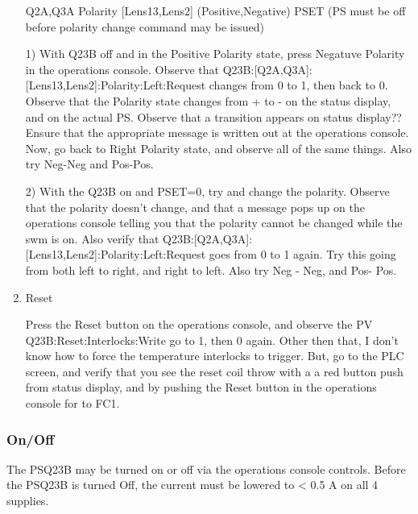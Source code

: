 \documentclass[11pt]{book}		%
\begin{document}
\begin{enumerate}
 \item [Q2A,Q3A] Polarity [Lens13,Lens2] (Positive,Negative) PSET (PS must be off before polarity change command may be issued)

\color{red}

1) With Q23B off and in the Positive Polarity state, press Negatuve Polarity in the operations console. Observe that Q23B:[Q2A,Q3A]:[Lens13,Lens2]:Polarity:Left:Request changes from 0 to 1, then back to 0. Observe that the Polarity state changes from + to - on the status display, and on the actual PS. Observe that a transition appears on status display?? Ensure that the appropriate message is written out at the operations console. Now, go back to Right Polarity state, and observe all of the same things. Also try Neg-Neg and Pos-Pos.

2) With the Q23B on and PSET=0, try and change the polarity. Observe that the polarity doesn't change, and that a message pops up on the operations console telling you that the polarity cannot be changed while the swm is on. Also verify that Q23B:[Q2A,Q3A]:[Lens13,Lens2]:Polarity:Left:Request goes from 0 to 1 again. Try this going from both left to right, and right to left. Also try Neg - Neg, and Pos- Pos.


\color{black}

 \item Reset

\color{red}

Press the Reset button on the operations console, and observe the PV Q23B:Reset:Interlocks:Write go to 1, then 0 again. Other then that, I don't know how to force the temperature interlocks to trigger. But, go to the PLC screen, and verify that you see the reset coil throw with a a red button push from status display, and by pushing the Reset button in the operations console for to FC1.

\color{black}

\end{enumerate}

\subsubsection{On/Off} \label{sect:cyc-equip-ctl-beamline-quad23b-state-controls-on-off}

The PSQ23B may be turned on or off via the operations console controls. Before the PSQ23B is turned Off, the current must be lowered to < 0.5 A on all 4 supplies.

\color{red}
\end{document}
